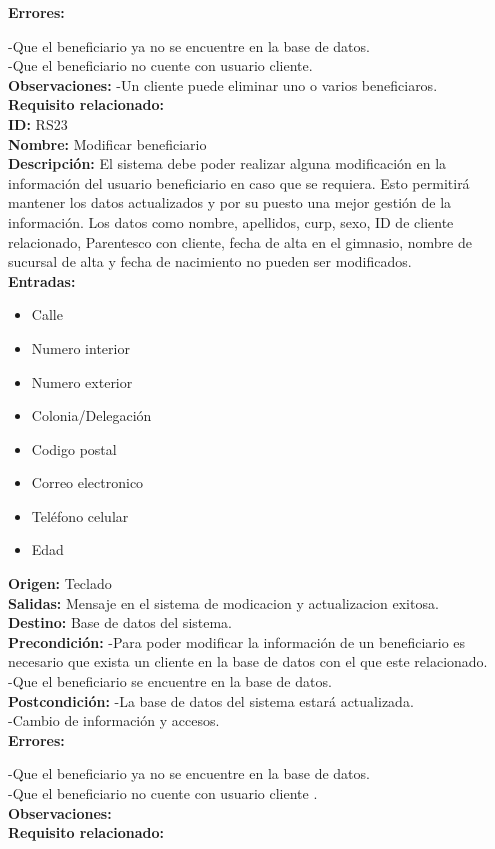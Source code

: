 \textbf{Errores: }

-Que el beneficiario ya  no se encuentre en la base de datos.\\
-Que el beneficiario no cuente con usuario cliente.\\

\textbf{Observaciones: }
-Un cliente puede eliminar  uno o varios beneficiaros.\\
\textbf{Requisito relacionado:} \\


\textbf{ID:} RS23\\
\textbf{Nombre:} Modificar beneficiario\\
\textbf{Descripción:} El sistema debe poder realizar alguna modificación en la información del usuario beneficiario en caso que se requiera. Esto permitirá mantener los datos actualizados y por su puesto una mejor gestión de la información. Los datos como nombre, apellidos, curp, sexo, ID de cliente relacionado, Parentesco con cliente, fecha de alta en el gimnasio, nombre de sucursal de alta y fecha de nacimiento no pueden ser modificados.\\

\textbf{Entradas: }
        \begin{itemize}
         \item Calle 
         \item Numero interior 
         \item Numero exterior 
         \item Colonia/Delegación
         \item Codigo postal
         \item Correo electronico
         \item Teléfono celular
         \item Edad 

\end{itemize}
\textbf{Origen:} Teclado\\
\textbf{Salidas:} Mensaje en el sistema de modicacion y actualizacion exitosa.\\
\textbf{Destino:} Base de datos del sistema.\\
\textbf{Precondición: }
-Para poder modificar la información de un beneficiario es necesario que exista un cliente en la base de datos con el que este relacionado.\\
-Que el beneficiario  se encuentre en la base de datos.\\


\textbf{Postcondición: }
-La base de datos del sistema estará actualizada.\\
-Cambio de información y accesos.\\


\textbf{Errores: }

-Que el beneficiario ya  no se encuentre en la base de datos.\\
-Que el beneficiario no cuente con usuario cliente .\\


\textbf{Observaciones: }
\\
\textbf{Requisito relacionado:} \\
